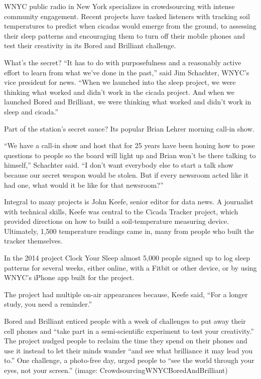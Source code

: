 \begin{itemize}
\begin{itemize}
\begin{enumerate}
{WNYC public radio in New York specializes in crowdsourcing with intense community engagement. Recent projects have tasked listeners with tracking soil temperatures to predict when cicadas would emerge from the ground, to assessing their sleep patterns and encouraging them to turn off their mobile phones and test their creativity in its Bored and Brilliant challenge.

What’s the secret? “It has to do with purposefulness and a reasonably active effort to learn from what we’ve done in the past,” said Jim Schachter, WNYC’s vice president for news. “When we launched into the sleep project, we were thinking what worked and didn’t work in the cicada project. And when we launched Bored and Brilliant, we were thinking what worked and didn’t work in sleep and cicada.”

Part of the station’s secret sauce? Its popular Brian Lehrer morning call-in show. 

“We have a call-in show and host that for 25 years have been honing how to pose questions to people so the board will light up and Brian won’t be there talking to himself,” Schachter said. “I don’t want everybody else to start a talk show because our secret weapon would be stolen. But if every newsroom acted like it had one, what would it be like for that newsroom?”

Integral to many projects is John Keefe, senior editor for data news. A journalist with technical skills, Keefe was central to the Cicada Tracker project, which provided directions on how to build a soil-temperature measuring device.\autocite{Cicadas} Ultimately, 1,500 temperature readings came in, many from people who built the tracker themselves.\autocite{Keefe}

In the 2014 project Clock Your Sleep\autocite{Sleep} almost 5,000 people signed up to log sleep patterns for several weeks, either online, with a Fitbit or other device, or by using WNYC’s iPhone app built for the project. 

The project had multiple on-air appearances because, Keefe said, “For a longer study, you need a reminder.” 

Bored and Brilliant\autocite{Bored} enticed people with a week of challenges to put away their cell phones and “take part in a semi-scientific experiment to test your creativity.” The project nudged people to reclaim the time they spend on their phones and use it instead to let their minds wander “and see what brilliance it may lead you to.” One challenge, a photo-free day, urged people to “see the world through your eyes, not your screen.” (image: CrowdsourcingWNYCBoredAndBrilliant)

}
\end{enumerate}
\end{itemize}
\end{itemize}
